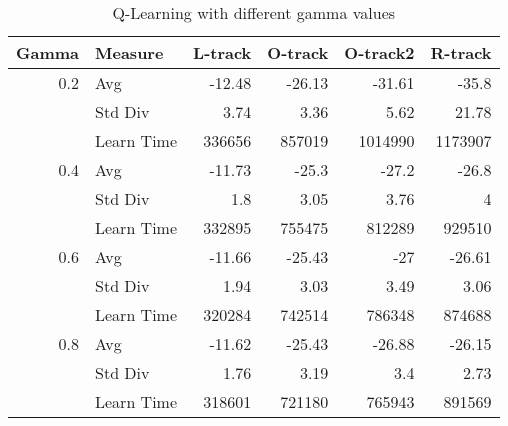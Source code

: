\documentclass[12pt, letterpaper]{article}
\begin{document}
\begin{table}[htbp]
\caption{Q-Learning with different gamma values}
\begin{center}
\begin{tabular}{|l|l|r|r|r|r|}
\hline
\textbf{Gamma} & \textbf{Measure} & \multicolumn{1}{l|}{\textbf{L-track}} & \multicolumn{1}{l|}{\textbf{O-track}} & \multicolumn{1}{l|}{\textbf{O-track2}} & \multicolumn{1}{l|}{\textbf{R-track}} \\ \hline
\multicolumn{1}{|r|}{0.2} & Avg & -12.48 & -26.13 & -31.61 & -35.8 \\ \hline
 & Std Div & 3.74 & 3.36 & 5.62 & 21.78 \\ \hline
 & Learn Time & 336656 & 857019 & 1014990 & 1173907 \\ \hline
\multicolumn{1}{|r|}{0.4} & Avg & -11.73 & -25.3 & -27.2 & -26.8 \\ \hline
 & Std Div & 1.8 & 3.05 & 3.76 & 4 \\ \hline
 & Learn Time & 332895 & 755475 & 812289 & 929510 \\ \hline
\multicolumn{1}{|r|}{0.6} & Avg & -11.66 & -25.43 & -27 & -26.61 \\ \hline
 & Std Div & 1.94 & 3.03 & 3.49 & 3.06 \\ \hline
 & Learn Time & 320284 & 742514 & 786348 & 874688 \\ \hline
\multicolumn{1}{|r|}{0.8} & Avg & -11.62 & -25.43 & -26.88 & -26.15 \\ \hline
 & Std Div & 1.76 & 3.19 & 3.4 & 2.73 \\ \hline
 & Learn Time & 318601 & 721180 & 765943 & 891569 \\ \hline
\end{tabular}
\end{center}
\label{q_gamma}
\end{table}
\end{document}
